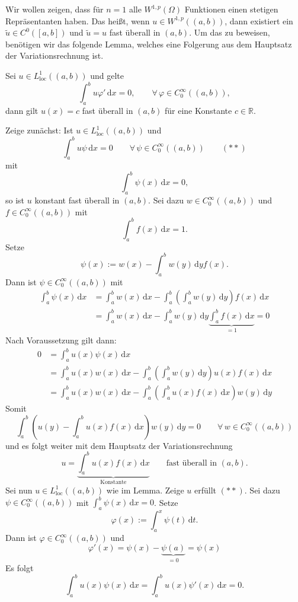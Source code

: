 Wir wollen zeigen, dass für $n=1$ alle $W^{1,p}(\Omega)$ Funktionen einen stetigen Repräsentanten haben. Das heißt, wenn $u \in W^{1,p}((a,b))$, dann existiert ein 
$ \tilde u \in C^0([a,b])$ und $\tilde u = u$ fast überall in $(a,b)$. Um das zu beweisen, benötigen wir das folgende Lemma, welches eine Folgerung aus dem Hauptsatz der Variationsrechnung ist.
\begin{lemma}
	Sei $u \in L^1_{\text{loc}}((a,b))$ und gelte
	\[
		\int_{a}^{b} u \varphi' \,\mathrm{d}x = 0, \qquad \forall\, \varphi \in C^{\infty}_0((a,b)),
	\]
	dann gilt $u(x)= c$ fast überall in $(a,b)$ für eine Konstante $c \in \mathbb{R}$.
	
\end{lemma}
\begin{beweis}
	Zeige zunächst: Ist $u \in L^1_{\text{loc}}((a,b))$ und 
	\[
		\int_{a}^{b} u \psi \,\mathrm{d}x = 0 \qquad \forall\, \psi \in C^{\infty}_0((a,b))  \qquad (**)
	\]
	mit
	\[
		\int_{a}^{b}\psi(x) \,\mathrm{d}x = 0,
	\]
	so ist $u$ konstant fast überall in $(a,b)$. Sei dazu $w \in C^{\infty}_0((a,b))$ und $f \in C^{\infty}_0((a,b))$ mit 
	\[
		\int_{a}^{b}f(x) \,\mathrm{d}x =1.
	\]
	Setze \[
		\psi(x) := w(x) - \int_{a}^{b} w(y) \,\mathrm{d}y f(x).
	\]
	Dann ist $\psi \in C^{\infty}_0((a,b))$ mit 
	\begin{align*}
		\int_{a}^{b} \psi(x) \,\mathrm{d}x &= \int_{a}^{b}w(x) \,\mathrm{d}x - \int_{a}^{b} \left( \int_{a}^{b} w(y) \,\mathrm{d}y  \right) f(x) \,\mathrm{d}x \\
		&= \int_{a}^{b}w(x) \,\mathrm{d}x - \int_{a}^{b} w(y) \,\mathrm{d}y \underset{=1}{\underbrace{\int_{a}^{b} f(x) \,\mathrm{d}x}} =0
	\end{align*}
	Nach Voraussetzung gilt dann:
	\begin{align*}
		0 &= \int_{a}^{b}u(x)\psi(x) \,\mathrm{d}x  \\ 
		&= \int_{a}^{b} u(x)w(x) \,\mathrm{d}x - \int_{a}^{b}\left( \int_{a}^{b}w(y) \,\mathrm{d}y \right) u(x)f(x) \,\mathrm{d}x \\
		&= \int_{a}^{b}u(x)w(x) \,\mathrm{d}x - \int_{a}^{b} \left( \int_{a}^{b}u(x)f(x) \,\mathrm{d}x \right) w(y) \,\mathrm{d}y 
	\end{align*}
	Somit
	\[
		\int_{a}^{b}\left( u(y)- \int_{a}^{b} u(x)f(x) \,\mathrm{d}x \right) w(y) \,\mathrm{d}y = 0 \qquad \forall\, w \in C^{\infty}_0((a,b))
	\]
	und es folgt weiter mit dem Hauptsatz der Variationsrechnung
	\[
		u = \underset{\text{Konstante}}{\underbrace{\int_{a}^{b}u(x)f(x) \,\mathrm{d}x}} \qquad \text{fast überall in }(a,b).
	\]
	Sei nun $u \in L^1_{\text{loc}}((a,b))$ wie im Lemma. Zeige $u$ erfüllt $(**)$. Sei dazu $ \psi \in C^{\infty}_0((a,b))$ mit $\int_{a}^{b}\psi(x) \,\mathrm{d}x =0$.
	Setze
	\[
		\varphi(x):= \int_{a}^{x}\psi(t) \,\mathrm{d}t.
	\]
	Dann ist $\varphi \in C^{\infty}_0((a,b))$ und 
	\[
		\varphi'(x) = \psi(x) - \underset{=0}{\underbrace{\psi(a)}} = \psi(x)
	\]
	Es folgt
	\[
		\int_{a}^{b} u(x) \psi(x) \,\mathrm{d}x = \int_{a}^{b} u(x)\psi'(x) \,\mathrm{d}x =0.
	\]
\end{beweis}

